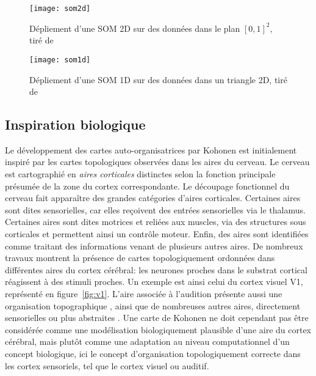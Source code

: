 \documentclass[../main]{subfiles}
\begin{document}
\begin{figure}
\centering
\texttt{[image: som2d]}
\caption{Dépliement d'une SOM 2D sur des données dans le plan $[0,1]^2$, tiré de~\cite{Kohonen1995SelfOrganizingM} \label{fig:som2d}}

\end{figure}

\begin{figure}
\centering
\texttt{[image: som1d]}
\caption{Dépliement d'une SOM 1D sur des données dans un triangle 2D, tiré de~\cite{Kohonen1995SelfOrganizingM}\label{fig:som1d}}

\end{figure}


\subsection{Inspiration biologique}

Le développement des cartes auto-organisatrices par Kohonen est initialement inspiré par les cartes topologiques observées dans les aires du cerveau. 
Le cerveau est cartographié en \emph{aires corticales} distinctes selon la fonction principale présumée de la zone du cortex correspondante.
Le découpage fonctionnel du cerveau fait apparaître des grandes catégories d'aires corticales. Certaines aires sont dites sensorielles, car elles reçoivent des entrées sensorielles via le thalamus. Certaines aires sont dites motrices et reliées aux muscles, via des structures sous corticales et permettent ainsi un contrôle moteur.
Enfin, des aires sont identifiées comme traitant des informations venant de plusieurs autres aires.
De nombreux travaux montrent la présence de cartes topologiquement ordonnées dans différentes aires du cortex cérébral: les neurones proches dans le substrat cortical réagissent à des stimuli proches. 
Un exemple est ainsi celui du cortex visuel V1, représenté en figure~\ref{fig:v1}. 
L'aire associée à l'audition présente aussi une organisation topographique \cite{Reale1980TonotopicOI}, ainsi que de nombreuses autres aires, directement sensorielles ou plus abstraites \cite{Kohonen1995SelfOrganizingM}. 
Une carte de Kohonen ne doit cependant pas être considérée comme une modélisation biologiquement plausible d'une aire du cortex cérébral, mais plutôt comme une adaptation au niveau computationnel d'un concept biologique, ici le concept d'organisation topologiquement correcte dans les cortex sensoriels, tel que le cortex visuel ou auditif.
\end{document}
